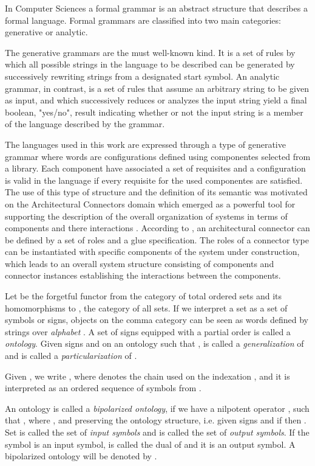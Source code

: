 \documentclass[oribibl]{llncs}
\begin{document}
In Computer Sciences a formal grammar is an abstract structure that describes a formal language. Formal grammars are classified into two main categories: generative or analytic.

The generative grammars are the must well-known kind. It is a set of rules by which all possible strings in the language to be described can be generated by successively rewriting strings from a designated start symbol. An analytic grammar, in contrast, is a set of rules that assume an arbitrary string to be given as input, and which successively reduces or analyzes the input string yield a final boolean, "yes/no", result indicating whether or not the input string is a member of the language described by the grammar.

The languages used in this work are expressed through a type of generative grammar where words are configurations defined using componentes selected from a library. Each component have associated a set of requisites and a configuration is valid in the language if every requisite for the used componentes are satisfied. The use of this type of structure and the definition of its semantic was motivated on the Architectural Connectors domain which emerged as a powerful tool for supporting the description of the overall organization of systems in terms of components and there interactions \cite{Fiadeiro97} \cite{Bass98} \cite{Perry92}. According to \cite{Allen97}, an architectural connector can be defined by a set of roles and a glue specification. The roles of a connector type can be instantiated with specific components of the system under construction, which leads to an overall system structure consisting of components and connector instances establishing the interactions between the components.

Let  be the forgetful functor from the category of total ordered sets and its
homomorphisms to , the category of all sets. If we interpret a set  as a set of symbols or signs, objects on the comma category  can
be seen as words defined by strings over \emph{alphabet} . A set of signs  equipped with a partial order  is called a \emph{ontology}. Given signs  and  on an ontology  such that ,  is called a \emph{generalization} of  and   is called a \emph{particularization} of .

Given , we write , where  denotes the chain used on the indexation ,
and it is interpreted as an ordered sequence of symbols from
.

An ontology  is called a \emph{bipolarized ontology}, if we have
a nilpotent operator , such that
, where , and preserving the ontology structure, i.e. given signs  and   if  then .
Set  is called the set of  \emph{input symbols}
and  is called the set of  \emph{output symbols}.
If the symbol  is an input symbol,  is called
the dual of  and it is an output symbol. A bipolarized
ontology will be denoted by .
\end{document}
